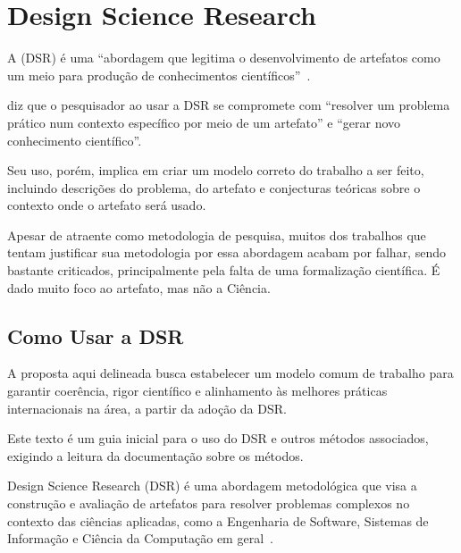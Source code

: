 \section{Design Science Research}
\label{sec:dsr}

A  (DSR) é uma ``abordagem que legitima o desenvolvimento de artefatos como um meio para produção de conhecimentos científicos''~\citep{Pimentel2019}. 

\citet{Pimentel2019} diz que o pesquisador ao usar a DSR se compromete com ``resolver um problema prático num contexto específico por meio de um artefato'' e ``gerar novo conhecimento científico''.

Seu uso, porém, implica em criar um modelo correto do trabalho a ser feito, incluindo descrições do problema, do artefato e conjecturas teóricas sobre o contexto onde o artefato será usado.

Apesar de atraente como metodologia de pesquisa, muitos dos trabalhos que tentam justificar sua metodologia por essa abordagem acabam por falhar, sendo bastante criticados, principalmente pela falta de uma formalização científica. É dado muito foco ao artefato, mas não a Ciência\citet{Pimentel2019}.



\subsection{Como Usar a DSR}

A proposta aqui delineada busca estabelecer um modelo comum de trabalho para garantir coerência, rigor científico e alinhamento às melhores práticas internacionais na área, a partir da adoção da DSR. 

Este texto é um guia inicial para o uso do DSR e outros métodos associados, exigindo a leitura da documentação sobre os métodos.

Design Science Research (DSR) é uma abordagem metodológica que visa a construção e avaliação de artefatos para resolver problemas complexos no contexto das ciências aplicadas, como a Engenharia de Software, Sistemas de Informação e Ciência da Computação em geral~\citep{hevner2004design}. 

